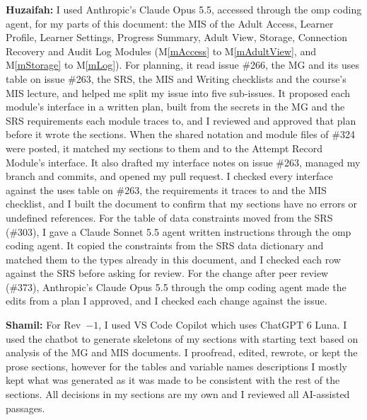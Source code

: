 \documentclass[12pt, titlepage]{article}
\newcommand{\mref}[1]{M\ref{#1}}
\begin{document}
\textbf{Huzaifah:} I used Anthropic's Claude Opus 5.5, accessed through the
omp coding agent, for my parts of this document: the MIS of the Adult Access,
Learner Profile, Learner Settings, Progress Summary, Adult View, Storage,
Connection Recovery and Audit Log Modules (\mref{mAccess} to \mref{mAdultView},
and \mref{mStorage} to \mref{mLog}). For planning, it read issue \#266, the MG
and its uses table on issue \#263, the SRS, the MIS and Writing checklists and
the course's MIS lecture, and helped me split my issue into five sub-issues. It
proposed each module's interface in a written plan, built from the secrets in
the MG and the SRS requirements each module traces to, and I reviewed and
approved that plan before it wrote the sections. When the shared notation and
module files of \#324 were posted, it matched my sections to them and to the
Attempt Record Module's interface. It also drafted my interface notes on issue
\#263, managed my branch and commits, and opened my pull request. I checked
every interface against the uses table on \#263, the requirements it traces to
and the MIS checklist, and I built the document to confirm that my sections
have no errors or undefined references. For the table of data constraints moved
from the SRS (\#303), I gave a Claude Sonnet 5.5 agent written instructions
through the omp coding agent. It copied the constraints from the SRS data
dictionary and matched them to the types already in this document, and I
checked each row against the SRS before asking for review. For the change after
peer review (\#373), Anthropic's Claude Opus 5.5 through the omp coding agent
made the edits from a plan I approved, and I checked each change against the
issue.

\textbf{Shamil:} For Rev~$-1$, I used VS Code Copilot which uses ChatGPT 6 Luna. 
I used the chatbot to generate skeletons of my sections with starting text 
based on analysis of the MG and MIS documents. I proofread, edited, rewrote, 
or kept the prose sections, however for the tables and variable names 
descriptions I mostly kept what was generated as it was made to be consistent with 
the rest of the sections. All decisions in my sections are my own and I 
reviewed all AI-assisted passages.

\newpage{}
\end{document}
